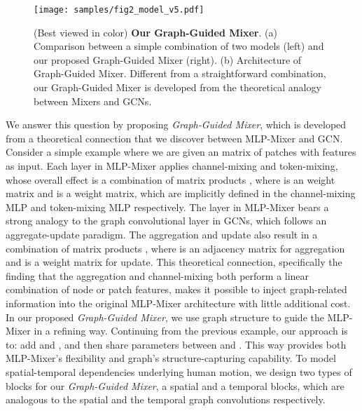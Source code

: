 \documentclass[10pt,twocolumn,letterpaper]{article}
\begin{document}
            \begin{figure*}[!ht]
            \centering
            \texttt{[image: samples/fig2\_model\_v5.pdf]} \caption{(Best viewed in color)
            \textbf{Our Graph-Guided Mixer}. (a) Comparison between a simple combination of two models (left) and our proposed Graph-Guided Mixer (right). (b) Architecture of Graph-Guided Mixer.
            Different from a straightforward combination, our Graph-Guided Mixer is developed from the theoretical analogy between Mixers and GCNs.
            }
            \label{network}
\end{figure*}

            
    We answer this question by proposing \textit{Graph-Guided Mixer}, which is developed from a theoretical connection that we discover between MLP-Mixer and GCN.
    Consider a simple example where we are given an  matrix  of  patches with  features as input.
    Each layer in MLP-Mixer applies channel-mixing and token-mixing, whose overall effect is a combination of matrix products , where  is an  weight matrix and  is a  weight matrix, which are implicitly defined in the channel-mixing MLP and token-mixing MLP respectively.
The layer in MLP-Mixer bears a strong analogy to the graph convolutional layer in GCNs, which follows an aggregate-update paradigm.
    The aggregation and update also result in a combination of matrix products , where  is an  adjacency matrix for aggregation and  is a  weight matrix for update.
This theoretical connection, specifically the finding that the aggregation and channel-mixing both perform a linear combination of node or patch features, makes it possible to inject graph-related information into the original MLP-Mixer architecture with little additional cost. In our proposed \textit{Graph-Guided Mixer}, we use graph structure to guide the MLP-Mixer in a refining way. Continuing from the previous example, our approach is to: add  and , and then share parameters between  and .
    This way provides both MLP-Mixer's flexibility and graph's structure-capturing capability.
    To model spatial-temporal dependencies underlying human motion, we design two types of blocks for our \textit{Graph-Guided Mixer}, a spatial and a temporal blocks, which are analogous to the spatial and the temporal graph convolutions respectively.
    
\end{document}
